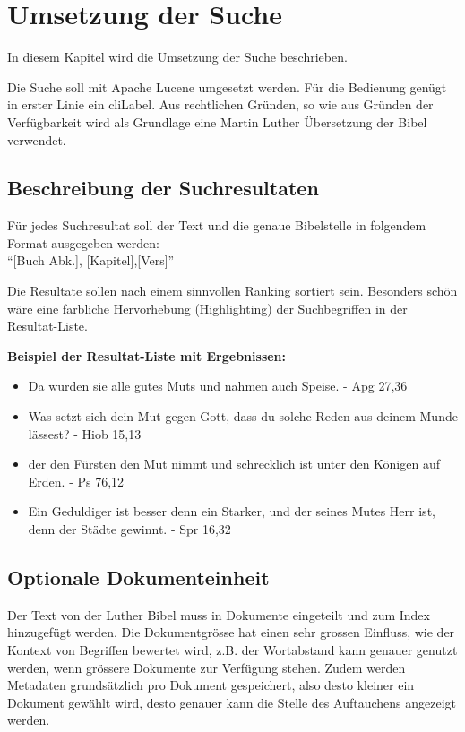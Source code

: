 \chapter{Umsetzung der Suche}
In diesem Kapitel wird die Umsetzung der Suche beschrieben.

Die Suche soll mit Apache Lucene umgesetzt werden. Für die Bedienung genügt in erster Linie ein \gls{cliLabel}.
Aus rechtlichen Gründen, so wie aus Gründen der Verfügbarkeit wird als Grundlage eine Martin Luther Übersetzung der Bibel verwendet.

\section{Beschreibung der Suchresultaten}
Für jedes Suchresultat soll der Text und die genaue Bibelstelle in folgendem Format ausgegeben werden:\\
"`[Buch Abk.], [Kapitel],[Vers]"'

Die Resultate sollen nach einem sinnvollen Ranking sortiert sein.
Besonders schön wäre eine farbliche Hervorhebung (Highlighting) der Suchbegriffen in der Resultat-Liste.

\textbf{Beispiel der Resultat-Liste mit Ergebnissen:}
\begin{itemize}
	\item Da wurden sie alle gutes Muts und nahmen auch Speise. - Apg 27,36
	\item Was setzt sich dein Mut gegen Gott, dass du solche Reden aus deinem Munde lässest? - Hiob 15,13
	\item der den Fürsten den Mut nimmt und schrecklich ist unter den Königen auf Erden. - Ps 76,12
	\item Ein Geduldiger ist besser denn ein Starker, und der seines Mutes Herr ist, denn der Städte gewinnt. - Spr 16,32
\end{itemize}


\section{Optionale Dokumenteinheit}
Der Text von der Luther Bibel muss in Dokumente eingeteilt und zum Index hinzugefügt werden.
Die Dokumentgrösse hat einen sehr grossen Einfluss, wie der Kontext von Begriffen bewertet wird, z.B. der Wortabstand kann genauer genutzt werden, wenn grössere Dokumente zur Verfügung stehen.
Zudem werden Metadaten grundsätzlich pro Dokument gespeichert, also desto kleiner ein Dokument gewählt wird, desto genauer kann die Stelle des Auftauchens angezeigt werden.

